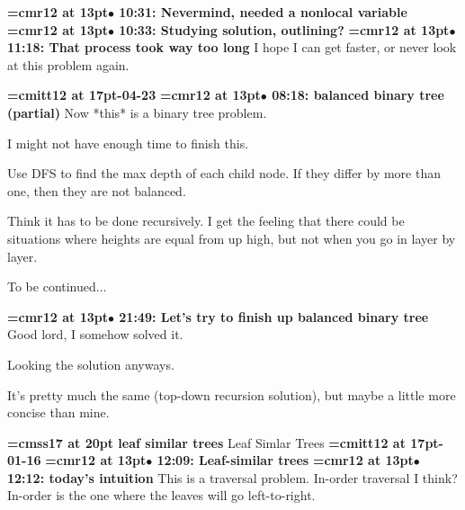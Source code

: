 {\smallskip\noindent\bf\font\titlefont=cmr12 at 13pt\titlefont $\bullet$ 10:31: Nevermind, needed a nonlocal variable}\smallskip
{\smallskip\noindent\bf\font\titlefont=cmr12 at 13pt\titlefont $\bullet$ 10:33: Studying solution, outlining?}\smallskip
{\smallskip\noindent\bf\font\titlefont=cmr12 at 13pt\titlefont $\bullet$ 11:18: That process took way too long}\smallskip
I hope I can get faster, or never look at this problem again.
\par

{\medskip\noindent\bf\font\titlefont=cmitt12 at 17pt-04-23}\medskip
{\smallskip\noindent\bf\font\titlefont=cmr12 at 13pt\titlefont $\bullet$ 08:18: balanced binary tree (partial)}\smallskip
Now *this* is a binary tree problem.
\par

I might not have enough time to finish this.
\par

Use DFS to find the max depth of each child node. If they differ by more than one, then they are not balanced.
\par

Think it has to be done recursively. I get the feeling that there could be situations where heights are equal from up high, but not when you go in layer by layer.
\par

To be continued...
\par

{\smallskip\noindent\bf\font\titlefont=cmr12 at 13pt\titlefont $\bullet$ 21:49: Let's try to finish up balanced binary tree}\smallskip
Good lord, I somehow solved it.
\par

Looking the solution anyways.
\par

It's pretty much the same (top-down recursion solution), but maybe a little more concise than mine.
\par

{\medskip\noindent\bf\font\titlefont=cmss17 at 20pt leaf similar trees} Leaf Simlar Trees
{\medskip\noindent\bf\font\titlefont=cmitt12 at 17pt-01-16}\medskip
{\smallskip\noindent\bf\font\titlefont=cmr12 at 13pt\titlefont $\bullet$ 12:09: Leaf-similar trees}\smallskip
{\smallskip\noindent\bf\font\titlefont=cmr12 at 13pt\titlefont $\bullet$ 12:12: today's intuition}\smallskip
This is a traversal problem. In-order traversal I think? In-order is the one where the leaves will go left-to-right.
\par

